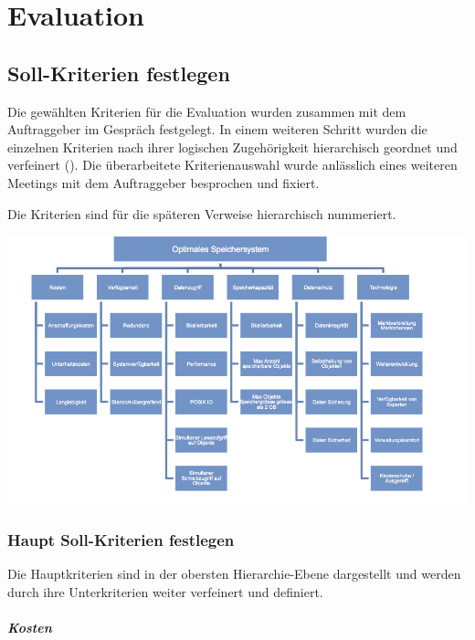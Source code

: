 \cleardoublepage
\chapter{Evaluation}

\section{Soll-Kriterien festlegen}
Die gewählten Kriterien für die Evaluation wurden zusammen mit dem Auftraggeber im Gespräch festgelegt. In einem weiteren Schritt wurden die einzelnen Kriterien nach ihrer logischen Zugehörigkeit hierarchisch geordnet und verfeinert (). Die überarbeitete Kriterienauswahl wurde anlässlich eines weiteren Meetings mit dem Auftraggeber besprochen und fixiert. 

Die Kriterien sind für die späteren Verweise hierarchisch nummeriert.

\begin{center}
\includegraphics[width=\linewidth, keepaspectratio = true]{media/ahp_kirterienbaum.png}
\end{center}

\subsection{Haupt Soll-Kriterien festlegen}
Die Hauptkriterien sind in der obersten Hierarchie-Ebene dargestellt und werden durch ihre Unterkriterien weiter verfeinert und definiert.

\renewcommand{\theparagraph}{Soll-\arabic{paragraph}}
\setcounter{paragraph}{0}
\paragraph{Kosten}\label{Soll-1}

